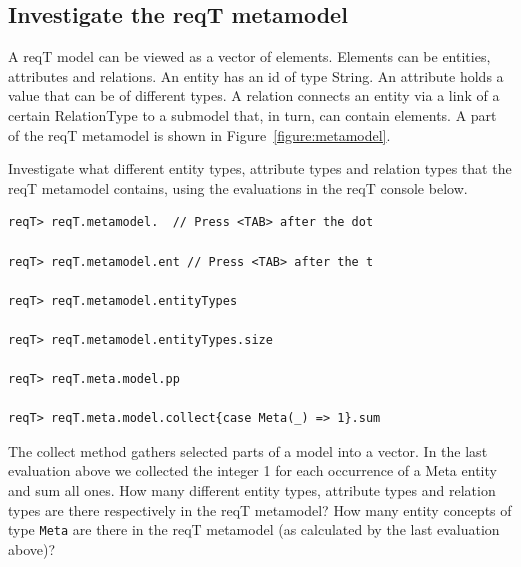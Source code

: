 \documentclass[11pt]{article}
\begin{document}
\subsection{Investigate the reqT metamodel}

A reqT model can be viewed as a vector of elements. Elements can be entities, attributes and relations. An entity has an id of type String. An attribute holds a value that can be of different types. A relation connects an entity via a link of a certain RelationType to a submodel that, in turn, can contain elements. A part of the reqT metamodel is shown in Figure~\ref{figure:metamodel}. 

Investigate what different entity types, attribute types and relation types that the reqT metamodel contains, using the evaluations in the reqT console below. 

\begin{framed}{\footnotesize\begin{verbatim}
reqT> reqT.metamodel.  // Press <TAB> after the dot

reqT> reqT.metamodel.ent // Press <TAB> after the t

reqT> reqT.metamodel.entityTypes

reqT> reqT.metamodel.entityTypes.size

reqT> reqT.meta.model.pp

reqT> reqT.meta.model.collect{case Meta(_) => 1}.sum
\end{verbatim}}
\noindent The collect method gathers selected parts of a model into a vector. In the last evaluation above we collected the integer 1 for each occurrence of a Meta entity and sum all ones.
\newline\newline 
\noindent
How many different entity types, attribute types and relation types are there respectively in the reqT metamodel? 
\newline
\newline \underline{\hspace{10cm}}
\newline\newline
How many entity concepts of type \verb+Meta+  are there in the reqT metamodel (as calculated by the last evaluation above)? 
\newline
\newline \underline{\hspace{10cm}}
\end{framed}
\end{document}
